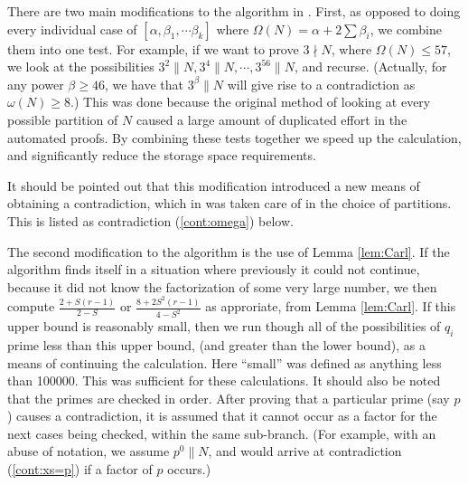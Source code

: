 \documentclass{article}
\begin{document}
There are two main modifications to the algorithm in \cite{Hare05a}.
First, as opposed to doing every individual case of $[\alpha, \beta_1, \cdots
    \beta_k]$ where $\Omega(N) = \alpha + 2 \sum \beta_i$, we combine them into 
    one test.
For example, if we want to prove $3 \nmid N$, where $\Omega(N) \leq 57$, 
    we look at the possibilities 
    $3^2\parallel N, 3^4 \parallel N, \cdots, 3^{56}\parallel N$, and recurse.
(Actually, for any power $\beta \geq 46$, we have that $3^\beta\parallel N$ 
    will give
    rise to a contradiction as $\omega(N) \geq 8$.)
This was done because the original method of looking at every possible 
    partition of $N$ caused a large amount of duplicated effort in the
    automated proofs.
By combining these tests together we speed up the calculation, and 
    significantly reduce the storage space requirements.

It should be pointed out that this modification introduced a new means of 
    obtaining a contradiction,
    which in \cite{Hare05a} was taken care of in the choice of 
    partitions.  
This is listed as contradiction (\ref{cont:omega}) below.

The second modification to the algorithm is the use of Lemma \ref{lem:Carl}.
If the algorithm finds itself in a situation where previously it could not 
    continue, because it did not know the factorization of some very 
    large number, we then compute 
    $\frac{2 + S (r-1)}{2-S}$ or $\frac{8 + 2 S^2 (r-1)}{4 - S^2}$
    as approriate, from Lemma \ref{lem:Carl}.
If this upper bound is reasonably small, then we run though all of the 
    possibilities of $q_i$ prime less than this upper bound, 
   (and greater than the lower bound),
    as a means of continuing the calculation.
Here ``small'' was defined as anything less than 100000.
This was sufficient for these calculations.
It should also be noted that the primes are checked in order. 
After proving that a particular prime (say $p$) causes a contradiction,
    it is assumed that it cannot occur as a factor for the next cases
    being checked, within the same sub-branch.
(For example, with an abuse of notation, we assume $p^0 \parallel N$, and
    would arrive at contradiction (\ref{cont:xs=p}) if a factor of $p$ 
    occurs.)
\end{document}
